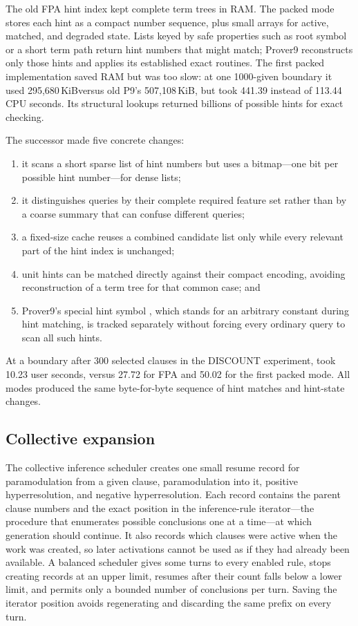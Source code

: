 \documentclass[11pt]{article}
\newcommand{\setting}[1]{\texttt{\detokenize{#1}}}
\newcommand{\kib}{\,KiB}
\begin{document}
The old FPA hint index kept complete term trees in RAM.  The packed mode stores
each hint as a compact number sequence, plus small arrays for active, matched,
and degraded state.  Lists keyed by safe properties such as root symbol or a
short term path return hint numbers that might match; Prover9 reconstructs only
those hints and applies its established exact routines.  The first packed
implementation saved RAM but was too slow: at one 1000-given boundary it used
295,680\kib versus old P9's 507,108\kib, but took 441.39 instead of 113.44 CPU
seconds.  Its structural lookups returned billions of possible hints for exact
checking.

The successor \setting{packed_fast} made five concrete changes:
\begin{enumerate}
  \item it scans a short sparse list of hint numbers but uses a bitmap---one
        bit per possible hint number---for dense lists;
  \item it distinguishes queries by their complete required feature set rather
        than by a coarse summary that can confuse different queries;
  \item a fixed-size cache reuses a combined candidate list only while every
        relevant part of the hint index is unchanged;
  \item unit hints can be matched directly against their compact encoding,
        avoiding reconstruction of a term tree for that common case; and
  \item Prover9's special hint symbol \setting{_AnyConst}, which stands for an
        arbitrary constant during hint matching, is tracked separately without
        forcing every ordinary query to scan all such hints.
\end{enumerate}
At a boundary after 300 selected clauses in the DISCOUNT experiment,
\setting{packed_fast} took 10.23 user seconds, versus 27.72 for FPA and 50.02
for the first packed mode.  All modes produced the same byte-for-byte sequence
of hint matches and hint-state changes.

\subsection{Collective expansion}

The collective inference scheduler creates one small resume record for paramodulation from
a given clause, paramodulation into it, positive hyperresolution, and negative
hyperresolution.  Each record contains the parent clause numbers and the exact
position in the inference-rule iterator---the procedure that enumerates
possible conclusions one at a time---at which generation should continue.  It
also records which
clauses were active when the work was created, so later activations cannot be
used as if they had already been available.  A balanced scheduler gives some
turns to every enabled rule, stops creating records at an upper limit, resumes
after their count falls below a lower limit, and permits only a bounded number
of conclusions per turn.  Saving the iterator position avoids regenerating and
discarding the same prefix on every turn.
\end{document}
